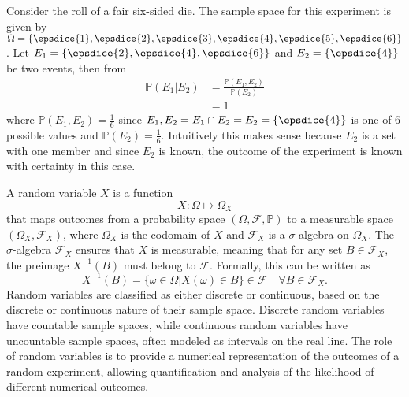\begin{example}
	Consider the roll of a fair six-sided die. The sample space for this experiment is given by $\Omega = \{ \epsdice{1}, \epsdice{2}, \epsdice{3}, \epsdice{4}, \epsdice{5}, \epsdice{6} \}$. Let $E_1 = \{\epsdice{2}, \epsdice{4}, \epsdice{6}\}$ and $E_2 = \{\epsdice{4}\}$ be two events, then from 
	\begin{equation}
		\begin{split}
			\mathbb{P}(E_1|E_2) &= \frac{\mathbb{P}(E_1, E_2)}{\mathbb{P}(E_2)}\\
			& = 1
		\end{split}
	\end{equation}
	where $\mathbb{P}(E_1,E_2)= \frac{1}{6}$ since $E_1,E_2 = E_1\cap E_2 = E_2=\{\epsdice{4}\}$ is one of $6$ possible values and $\mathbb{P}(E_2) = \frac{1}{6}$. Intuitively this makes sense because $E_2$ is a set with one member and since $E_2$ is known, the outcome of the experiment is known with certainty in this case.
\end{example}

\begin{definition}
	\label{def:random_Variable}
	A random variable $X$ is a function
	\begin{equation}
		X: \Omega \mapsto \Omega_X
	\end{equation}
	that maps outcomes from a probability space $(\Omega, \mathcal{F}, \mathbb{P})$ to a measurable space $(\Omega_X, \mathcal{F}_X)$, where $\Omega_X$ is the codomain of $X$ and $\mathcal{F}_X$ is a $\sigma$-algebra on $\Omega_X$. The $\sigma$-algebra $\mathcal{F}_X$ ensures that $X$ is measurable, meaning that for any set $B \in \mathcal{F}_X$, the preimage $X^{-1}(B)$ must belong to $\mathcal{F}$. Formally, this can be written as
	\begin{equation}
		X^{-1}(B) = \{\omega \in \Omega | X(\omega) \in B\} \in \mathcal{F} \quad \forall B \in \mathcal{F}_X.
	\end{equation}
	Random variables are classified as either discrete or continuous, based on the discrete or continuous nature of their sample space. Discrete random variables have countable sample spaces, while continuous random variables have uncountable sample spaces, often modeled as intervals on the real line. The role of random variables is to provide a numerical representation of the outcomes of a random experiment, allowing quantification and analysis of the likelihood of different numerical outcomes. 
\end{definition}

